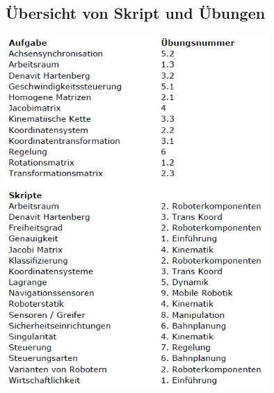 	\subsection{Übersicht von Skript und Übungen}
	\includegraphics[width=10cm]{./bilder/uebersicht.png}